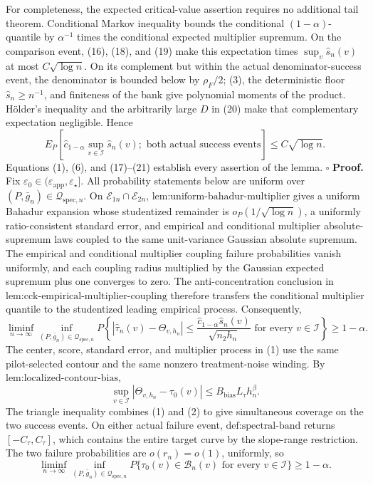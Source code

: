 For completeness, the expected critical-value assertion requires no additional tail theorem.  Conditional Markov inequality bounds the conditional \((1-\alpha)\)-quantile by \(\alpha^{-1}\) times the conditional expected multiplier supremum.  On the comparison event, (16), (18), and (19) make this expectation times \(\sup_v\widehat s_n(v)\) at most \(C\sqrt{\log n}\).  On its complement but within the actual denominator-success event, the denominator is bounded below by \(\rho_F/2\); (3), the deterministic floor \(\widehat s_n\ge n^{-1}\), and finiteness of the bank give polynomial moments of the product.  H\"older's inequality and the arbitrarily large \(D\) in (20) make that complementary expectation negligible.  Hence
\[
 E_P\!\left[\widehat c_{1-\alpha}\sup_{v\in\mathcal I}\widehat s_n(v);
 \text{ both actual success events}\right]\le C\sqrt{\log n}. \tag{21}
\]
Equations (1), (6), and (17)--(21) establish every assertion of the lemma. \(\square\)
\textbf{Proof.}
Fix \(\varepsilon_0\in(\varepsilon_{\mathrm{app}},\varepsilon_\star]\).  All probability statements below are uniform over \((P,\bar g_n)\in\mathcal Q_{\mathrm{spec},n}\).  On \(\mathcal E_{1n}\cap\mathcal E_{2n}\), \(\text{lem:uniform-bahadur-multiplier}\) gives a uniform Bahadur expansion whose studentized remainder is \(o_P(1/\sqrt{\log n})\), a uniformly ratio-consistent standard error, and empirical and conditional multiplier absolute-supremum laws coupled to the same unit-variance Gaussian absolute supremum.  The empirical and conditional multiplier coupling failure probabilities vanish uniformly, and each coupling radius multiplied by the Gaussian expected supremum plus one converges to zero.  The anti-concentration conclusion in \(\text{lem:cck-empirical-multiplier-coupling}\) therefore transfers the conditional multiplier quantile to the studentized leading empirical process.  Consequently,
\[
 \liminf_{n\to\infty}\inf_{(P,\bar g_n)\in\mathcal Q_{\mathrm{spec},n}}
 P\left\{
 |\widehat\tau_n(v)-\Theta_{v,h_n}|
 \le\frac{\widehat c_{1-\alpha}\widehat s_n(v)}{\sqrt{n_2h_n}}
 \text{ for every }v\in\mathcal I
 \right\}\ge1-\alpha. \tag{1}
\]
The center, score, standard error, and multiplier process in (1) use the same pilot-selected contour and the same nonzero treatment-noise winding.  By \(\text{lem:localized-contour-bias}\),
\[
 \sup_{v\in\mathcal I}|\Theta_{v,h_n}-\tau_0(v)|
 \le B_{\mathrm{bias}}L_\tau h_n^\beta. \tag{2}
\]
The triangle inequality combines (1) and (2) to give simultaneous coverage on the two success events.  On either actual failure event, \(\text{def:spectral-band}\) returns \([-C_\tau,C_\tau]\), which contains the entire target curve by the slope-range restriction.  The two failure probabilities are \(o(r_n)=o(1)\), uniformly, so
\[
 \liminf_{n\to\infty}\inf_{(P,\bar g_n)\in\mathcal Q_{\mathrm{spec},n}}
 P\{\tau_0(v)\in\mathcal B_n(v)\text{ for every }v\in\mathcal I\}
 \ge1-\alpha. \tag{3}
\]

